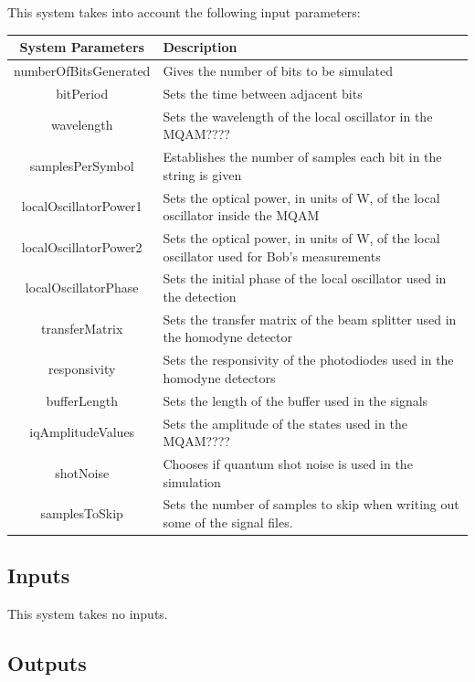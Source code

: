 This system takes into account the following input parameters:
\begin{table}[H]
\centering
\begin{tabulary}{1.0\textwidth}{|C|L|}
\hline
\textbf{System Parameters} & \textbf{Description}\\
\hline
numberOfBitsGenerated   & Gives the number of bits to be simulated\\
\hline
bitPeriod               & Sets the time between adjacent bits\\
\hline
wavelength              & Sets the wavelength of the local oscillator in the MQAM????\\
\hline
samplesPerSymbol        & Establishes the number of samples each bit in the string is given\\
\hline
localOscillatorPower1   & Sets the optical power, in units of W, of the local oscillator inside the MQAM\\
\hline
localOscillatorPower2   & Sets the optical power, in units of W, of the local oscillator used for Bob's measurements\\
\hline
localOscillatorPhase    & Sets the initial phase of the local oscillator used in the detection\\
\hline
transferMatrix          & Sets the transfer matrix of the beam splitter used in the homodyne detector\\
\hline
responsivity            & Sets the responsivity of the photodiodes used in the homodyne detectors\\
\hline
bufferLength            & Sets the length of the buffer used in the signals\\
\hline
iqAmplitudeValues       & Sets the amplitude of the states used in the MQAM????\\
\hline
shotNoise               & Chooses if quantum shot noise is used in the simulation\\
\hline
samplesToSkip			& Sets the number of samples to skip when writing out some of the signal files.\\
\hline
\end{tabulary}
\end{table}		

\subsection*{Inputs}

This system takes no inputs.

\pagebreak
\subsection*{Outputs}

